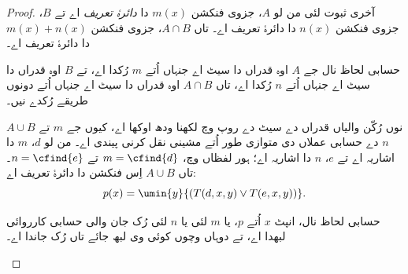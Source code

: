 \documentclass[../../../include/open-logic-section]{subfiles}
\begin{document}
\begin{proof}
آخری ثبوت لئی من لو $A$، جزوی
فنکشن $m(x)$ دا \emph{دائرۂ تعریف}
اے تے $B$، جزوی فنکشن $n(x)$
دا دائرۂ تعریف اے۔ تاں $A \cap B$،
جزوی فنکشن $m(x) +
n(x)$ دا دائرۂ تعریف اے۔

\begin{explain}
حسابی لحاظ نال جے $A$ اوہ قدراں
دا سیٹ اے جنہاں اُتے $m$ رُکدا اے،
تے $B$ اوہ قدراں دا سیٹ اے جنہاں
اُتے $n$ رُکدا اے، تاں $A \cap B$
اوہ قدراں دا سیٹ اے جنہاں اُتے
دونوں طریقے رُکدے نیں۔
\end{explain}

$A \cup B$ نوں رُکّن والیاں قدراں
دے سیٹ دے روپ وچ لکھنا ودھ اوکھا اے،
کیوں جے $m$ تے $n$ دے حسابی عملاں دی
متوازی طور اُتے مشینی نقل کرنی پیندی اے۔ من لو
$d$، $m$ دا اشاریہ اے تے $e$،
$n$ دا اشاریہ اے؛ ہور لفظاں وچ،
$m = \cfind{d}$ تے $n = \cfind{e}$۔
تاں $A \cup B$ اِس فنکشن دا دائرۂ
تعریف اے:
\[
p(x) = \umin{y}{(T(d,x,y) \lor T(e,x,y))}.
\]
\begin{explain}
حسابی لحاظ نال، انپٹ $x$ اُتے $p$،
یا $m$ لئی یا $n$ لئی رُک جان والی
حسابی کارروائی لبھدا اے، تے دوہاں
وچوں کوئی وی لبھ جائے تاں رُک جاندا اے۔
\end{explain}
\end{proof}
\end{document}

